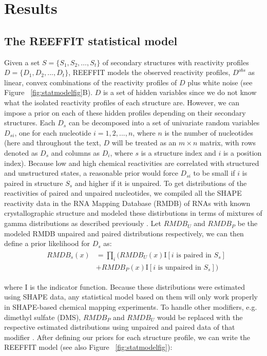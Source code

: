 \documentclass[12pt]{article}
\begin{document}
\section{Results}
\subsection{The REEFFIT statistical model}
Given a set $S =  \{ S_1, S_2, …, S_{t} \}$ of secondary structures with reactivity profiles $D = \{ D_{1}, D_{2}, ..., D_{t} \}$, REEFFIT models the observed reactivity profiles, $D^{obs}$ as linear, convex combinations of the reactivity profiles of $D$ plus white noise (see Figure ~\ref{fig:statmodelfig}B). 
$D$ is a set of hidden variables since we do not know what the isolated reactivity profiles of each structure are. 
However, we can impose a prior on each of these hidden profiles depending on their secondary structures. 
Each $D_{s}$ can be decomposed into a set of univariate random variables $D_{si}$, one for each nucleotide $i = 1, 2, ..., n$, where $n$ is the number of nucleotides (here and throughout the text, $D$ will be treated as an $m \times n$ matrix, with rows denoted as $D_{s}$ and columns as $D_{i}$, where $s$ is a structure index and $i$ is a position index). 
Because low and high chemical reactivities are correlated with structured and unstructured states, a reasonable prior would force $D_{si}$ to be small if $i$ is paired in structure $S_s$ and higher if it is unpaired. To get distributions of the reactivities of paired and unpaired nucleotides, we compiled all the SHAPE reactivity data in the RNA Mapping Database (RMDB) \cite{Cordero2012} of RNAs with known crystallographic structure and modeled these distirbutions in terms of mixtures of gamma distributions as described previously \cite{Cordero2012a}. 
Let $RMDB_U$ and $RMDB_P$ be the modeled RMDB unpaired and paired distributions respectively, we can then define a prior likelihood for $D_{s}$ as: 
\begin{align}
  &\begin{aligned}
RMDB_{s}(x) &= \prod_i (RMDB_U(x) \mbox{I}\left[i \mbox{ is paired in } S_s\right]\\ 
                &+ RMDB_P(x) \mbox{I}\left[i \mbox{ is unpaired in } S_s\right])
  \end{aligned}
\end{align}

where $\mbox{I}$ is the indicator function. Because these distributions were estimated using SHAPE data, any statistical model based on them will only work properly in SHAPE-based chemical mapping experiments. 
To handle other modifiers, e.g. dimethyl sulfate (DMS), $RMDB_P$ and $RMDB_U$ would be replaced with the respective estimated distributions using unpaired and paired data of that modifier \cite{Cordero2012a}. 
After defining our priors for each structure profile, we can write the REEFFIT model (see also Figure ~\ref{fig:statmodelfig}):
\end{document}
